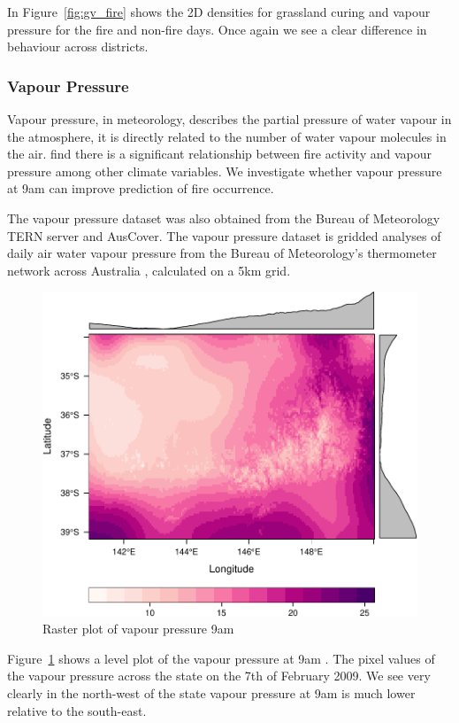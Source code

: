 \documentclass[11pt,a4paper]{article}
\begin{document}
In Figure~\ref{fig:gv_fire} shows the 2D densities for grassland curing and vapour pressure for the fire and non-fire days. Once again we see a clear difference in behaviour across districts.

\subsubsection{Vapour Pressure}

Vapour pressure, in meteorology, describes the partial pressure of water vapour in the atmosphere, it is directly related to the number of water vapour molecules in the air.  \citet{harris14} find there is a significant relationship between fire activity and vapour pressure among other climate variables. We investigate whether vapour pressure at 9am can improve prediction of fire occurrence.

The vapour pressure dataset was also obtained from the Bureau of Meteorology TERN server and AusCover. The vapour pressure dataset is gridded analyses of daily air water vapour pressure from the Bureau of Meteorology's thermometer network across Australia \citep{jones09}, calculated on a 5km grid.

\begin{figure}
  \centering
	\includegraphics[width=.8\textwidth]{figures/vap_ras.pdf}
  \caption{Raster plot of vapour pressure 9am }
  \label{fig:vap_ras}
\end{figure}

Figure~\ref{fig:vap_ras} shows a level plot of the vapour pressure at 9am \citep{rastervis}. The pixel values of the vapour pressure across the state on the 7th of February 2009. We see very clearly in the north-west of the state vapour pressure at 9am is much lower relative to the south-east.
\end{document}
